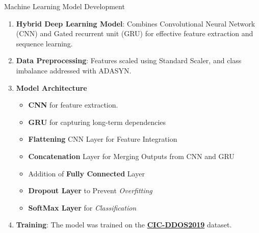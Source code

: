 \documentclass{beamer}
\begin{document}
\begin{frame}{Machine Learning Model Development}
\begin{enumerate}
    \item \textbf{Hybrid Deep Learning Model}: Combines Convolutional Neural Network (CNN) and Gated recurrent unit (GRU) for effective feature extraction and sequence learning.
    \item \textbf{Data Preprocessing}: Features scaled using Standard Scaler, and class imbalance addressed with ADASYN.
    \item \textbf{Model Architecture}
    \begin{itemize}
        \item \textbf{CNN} for feature extraction.
        \item \textbf{GRU} for capturing long-term dependencies
        \item \textbf{Flattening} CNN Layer for Feature Integration
        \item \textbf{Concatenation} Layer for Merging Outputs from CNN and GRU
        \item Addition of \textbf{Fully Connected} Layer
        \item \textbf{Dropout Layer} to Prevent \textit{Overfitting}
        \item \textbf{SoftMax Layer} for \textit{Classification}
    \end{itemize}
    \item \textbf{Training}: The model was trained on the \href{https://www.unb.ca/cic/datasets/ddos-2019.html}{\textbf{CIC-DDOS2019}} dataset.
\end{enumerate}
\end{frame}
\end{document}
